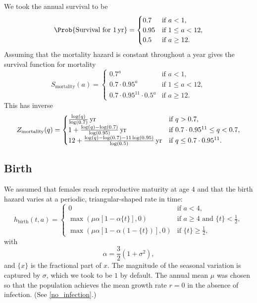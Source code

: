 \documentclass{jpmarticle}
\begin{document}
We took the annual survival to be
\begin{equation}
  \Prob\{\text{Survival for $\unit[1]{yr}$}\}
  =
  \begin{cases}
    0.7 & \text{if $a < 1$},
    \\
    0.95 & \text{if $1 \leq a < 12$},
    \\
    0.5 & \text{if $a \geq 12$}.
  \end{cases}
\end{equation}
Assuming that the mortality hazard is constant throughout a year gives
the survival function for mortality
\begin{equation}
  S_{\text{mortality}}(a) =
  \begin{cases}
    0.7^a & \text{if $a < 1$},
    \\
    0.7 \cdot 0.95^a & \text{if $1 \leq a < 12$},
    \\
    0.7 \cdot 0.95^{11} \cdot 0.5^a & \text{if $a \geq 12$}.
  \end{cases}
\end{equation}
This has inverse
\begin{equation}
  Z_{\text{mortality}}(q) =
  \begin{cases}
    \unit[\frac{\log(q)}{\log(0.7)}]{yr} & \text{if $q > 0.7$},
    \\
    \unit[1 + \frac{\log(q) - \log(0.7)}{\log(0.95)}]{yr}
    & \text{if $0.7 \cdot 0.95^{11} \leq q < 0.7$},
    \\
    \unit[12 + \frac{\log(q) - \log(0.7) - 11 \log(0.95)}{\log(0.5)}]{yr}
    & \text{if $q \leq 0.7 \cdot 0.95^{11}$}.
  \end{cases}
\end{equation}


\subsection{Birth}

We assumed that females reach reproductive maturity at age $4$ and
that the birth hazard varies at a periodic, triangular-shaped rate in
time:
\begin{equation}
  h_{\text{birth}}(t, a) =
  \begin{cases}
    0 & \text{if $a < 4$},
    \\
    \max\left(\mu \alpha \left[1 - \alpha \{t\}\right], 0\right)
    & \text{if $a \geq 4$ and $\{t\} < \frac{1}{2}$},
    \\
    \max\left(\mu \alpha \left[1 - \alpha (1 - \{t\})\right], 0\right)
    & \text{if $\{t\} \geq \frac{1}{2}$},
  \end{cases}
\end{equation}
with
\begin{equation}
  \alpha = \frac{3}{2} \left(1 + \sigma^2\right),
\end{equation}
and $\{x\}$ is the fractional part of $x$.  The magnitude of the
seasonal variation is captured by $\sigma$, which we took to be $1$ by
default.  The annual mean $\mu$ was chosen so that the population
achieves the mean growth rate $r = 0$ in the absence of infection.
(See \autoref{no_infection}.)
\end{document}
